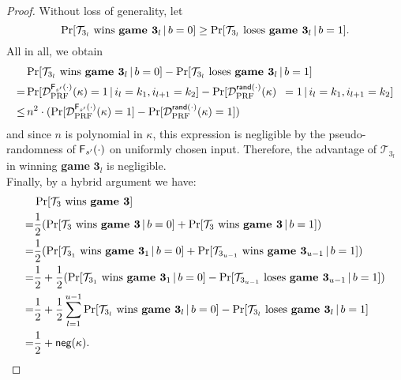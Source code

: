 \documentclass[10pt]{extarticle}
\begin{document}
\begin{proof}
\noindent Without loss of generality, let 
\[\Pr[\mathcal{T}_{3_l}\mbox{ wins \textbf{game }} \boldsymbol 3_l\,|\,b=0]\geq \Pr[\mathcal{T}_{3_l}\mbox{ loses \textbf{game }} \boldsymbol 3_l\,|\,b=1].\]
All in all, we obtain
\begin{align*} & \Pr[\mathcal{T}_{3_l}\mbox{ wins \textbf{game }} \boldsymbol 3_l\,|\,b=0]-\Pr[\mathcal{T}_{3_l}\mbox{ loses \textbf{game }} \boldsymbol 3_l\,|\,b=1]\\
 = & \Pr[\mathcal{D}_{\mbox{\scriptsize PRF}}^{\text{\upshape\sffamily F}_{s^\prime}(\cdot)}(\kappa)=1\,|\,i_l=k_1,i_{l+1}=k_2]-\Pr[\mathcal{D}_{\mbox{\scriptsize PRF}}^{\mbox{\scriptsize\upshape\sffamily rand}(\cdot)}(\kappa)\,\,\,=1\,|\,i_l=k_1,i_{l+1}=k_2]\\
 \leq & \,n^2\cdot (\Pr[\mathcal{D}_{\mbox{\scriptsize PRF}}^{\text{\upshape\sffamily F}_{s^\prime}(\cdot)}(\kappa)=1]-\Pr[\mathcal{D}_{\mbox{\scriptsize PRF}}^{\mbox{\scriptsize\upshape\sffamily rand}(\cdot)}(\kappa)=1])
\end{align*}
and since $n$ is polynomial in $\kappa$, this expression is negligible by the pseudo-randomness of $\text{\upshape\sffamily F}_{s^\prime}(\cdot)$ on uniformly chosen input. Therefore, the advantage of $\mathcal{T}_{3_l}$ in winning \textbf{game} $\boldsymbol 3_l$ is negligible.\\ 
Finally, by a hybrid argument we have:
\begin{align*} & \Pr[\mathcal{T}_{3}\mbox{ wins \textbf{game }} \boldsymbol 3]\\
 = & \frac{1}{2}(\Pr[\mathcal{T}_{3}\mbox{ wins \textbf{game }} \boldsymbol 3\,|\,b=0]+\Pr[\mathcal{T}_{3}\mbox{ wins \textbf{game }} \boldsymbol 3\,|\,b=1])\\
 = & \frac{1}{2}(\Pr[\mathcal{T}_{3_1}\mbox{ wins \textbf{game }} \boldsymbol 3_1\,|\,b=0]+\Pr[\mathcal{T}_{3_{u-1}}\mbox{ wins \textbf{game }} \boldsymbol 3_{u-1}\,|\,b=1])\\
 = & \frac{1}{2}+\frac{1}{2}(\Pr[\mathcal{T}_{3_1}\mbox{ wins \textbf{game }} \boldsymbol 3_1\,|\,b=0]-\Pr[\mathcal{T}_{3_{u-1}}\mbox{ loses \textbf{game }} \boldsymbol 3_{u-1}\,|\,b=1])\\
 = & \frac{1}{2}+\frac{1}{2}\sum_{l=1}^{u-1}\Pr[\mathcal{T}_{3_l}\mbox{ wins \textbf{game }} \boldsymbol 3_l\,|\,b=0]-\Pr[\mathcal{T}_{3_l}\mbox{ loses \textbf{game }} \boldsymbol 3_l\,|\,b=1]\\
 = & \frac{1}{2}+\text{\upshape\sffamily neg}(\kappa).
\end{align*}
\end{proof}\par\medskip
\end{document}
